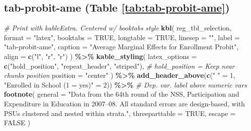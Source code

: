 \documentclass[
]{article}
\newenvironment{Shaded}{\begin{snugshade}}{\end{snugshade}}
\newcommand{\AttributeTok}[1]{\textcolor[rgb]{0.13,0.29,0.53}{#1}}
\newcommand{\CommentTok}[1]{\textcolor[rgb]{0.56,0.35,0.01}{\textit{#1}}}
\newcommand{\ConstantTok}[1]{\textcolor[rgb]{0.56,0.35,0.01}{#1}}
\newcommand{\DecValTok}[1]{\textcolor[rgb]{0.00,0.00,0.81}{#1}}
\newcommand{\FunctionTok}[1]{\textcolor[rgb]{0.13,0.29,0.53}{\textbf{#1}}}
\newcommand{\NormalTok}[1]{#1}
\newcommand{\OtherTok}[1]{\textcolor[rgb]{0.56,0.35,0.01}{#1}}
\newcommand{\SpecialCharTok}[1]{\textcolor[rgb]{0.81,0.36,0.00}{\textbf{#1}}}
\newcommand{\StringTok}[1]{\textcolor[rgb]{0.31,0.60,0.02}{#1}}
\begin{document}
\subsection*{tab-probit-ame (Table \ref{tab:tab-probit-ame})}\label{tab-probit-ame-table-reftabtab-probit-ame}

\begin{Shaded}
\begin{Highlighting}[]
\CommentTok{\# Print with kableExtra. Centered w/ booktabs style}
\FunctionTok{kbl}\NormalTok{(}
\NormalTok{  reg\_tbl\_selection,}
  \AttributeTok{format =} \StringTok{"latex"}\NormalTok{,}
  \AttributeTok{booktabs =} \ConstantTok{TRUE}\NormalTok{,}
  \AttributeTok{longtable =} \ConstantTok{TRUE}\NormalTok{,}
  \AttributeTok{linesep =} \StringTok{""}\NormalTok{,}
  \AttributeTok{label =} \StringTok{"tab{-}probit{-}ame"}\NormalTok{,}
  \AttributeTok{caption =} \StringTok{"Average Marginal Effects for Enrollment Probit"}\NormalTok{,}
  \AttributeTok{align =} \FunctionTok{c}\NormalTok{(}\StringTok{"l"}\NormalTok{, }\StringTok{"r"}\NormalTok{, }\StringTok{"r"}\NormalTok{)}
\NormalTok{) }\SpecialCharTok{\%\textgreater{}\%}
  \FunctionTok{kable\_styling}\NormalTok{(}
    \AttributeTok{latex\_options =} \FunctionTok{c}\NormalTok{(}\StringTok{"hold\_position"}\NormalTok{, }\StringTok{"repeat\_header"}\NormalTok{, }\StringTok{"striped"}\NormalTok{), }\CommentTok{\# hold\_position = Keep near chunk\textquotesingle{}s position}
    \AttributeTok{position =} \StringTok{"center"}
\NormalTok{  ) }\SpecialCharTok{\%\textgreater{}\%}
  \FunctionTok{add\_header\_above}\NormalTok{(}\FunctionTok{c}\NormalTok{(}\StringTok{" "} \OtherTok{=} \DecValTok{1}\NormalTok{, }\StringTok{"Enrolled in School (1 = yes)"} \OtherTok{=} \DecValTok{2}\NormalTok{)) }\SpecialCharTok{\%\textgreater{}\%} \CommentTok{\# Dep. var. label above numeric vars}
  \FunctionTok{footnote}\NormalTok{(}
    \AttributeTok{general =} \StringTok{"Data from the 64th round of the NSS, \textasciigrave{}\textasciigrave{}Participation and Expenditure in Education\textquotesingle{}\textquotesingle{} in 2007–08. All standard errors are design{-}based, with PSUs clustered and nested within strata."}\NormalTok{,}
    \AttributeTok{threeparttable =} \ConstantTok{TRUE}\NormalTok{,}
    \AttributeTok{escape =} \ConstantTok{FALSE}
\NormalTok{  )}
\end{Highlighting}
\end{Shaded}
\end{document}
